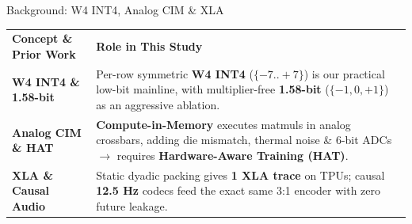 \documentclass[aspectratio=169,10pt]{beamer}
\begin{document}
\begin{frame}{Background: W4 INT4, Analog CIM \& XLA}
  \vspace*{0.18cm}
  \begin{center}
  \small
  \setlength{\tabcolsep}{7pt}
  \renewcommand{\arraystretch}{1.58}
  \begin{tabular}{@{}L{3.75cm}L{9.55cm}@{}}
    \textbf{\color{Teal}Concept \& Prior Work} & \textbf{\color{Teal}Role in This Study} \\
    \midrule
    \textbf{W4 INT4 \& 1.58-bit} &
    Per-row symmetric \textbf{W4 INT4} ($\{-7..+7\}$) is our practical low-bit mainline, with multiplier-free \textbf{1.58-bit} ($\{-1,0,+1\}$) as an aggressive ablation. \\
    \midrule
    \textbf{Analog CIM \& HAT} &
    \textbf{Compute-in-Memory} executes matmuls in analog crossbars, adding die mismatch, thermal noise \& 6-bit ADCs $\to$ requires \textbf{Hardware-Aware Training (HAT)}. \\
    \midrule
    \textbf{XLA \& Causal Audio} &
    Static dyadic packing gives \textbf{1 XLA trace} on TPUs; causal \textbf{12.5 Hz} codecs feed the exact same 3:1 encoder with zero future leakage. \\
    \bottomrule
  \end{tabular}
  \end{center}
\end{frame}
\end{document}
